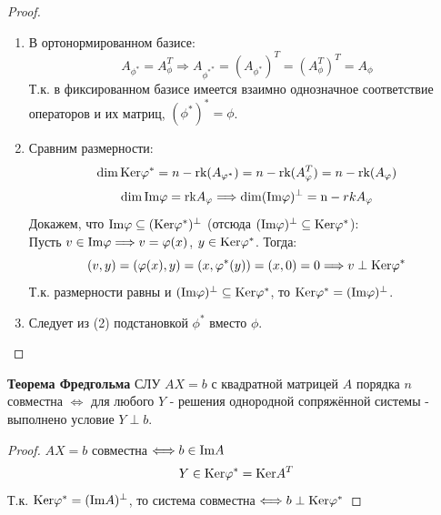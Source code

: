 \begin{proof} \tab
    \begin{enumerate}
        \item В ортонормированном базисе:
        $$A_{\phi^{*}} = A_{\phi}^T \Longrightarrow  A_{{\phi^{*}}^{*}} = (A_{\phi^{*}})^T = (A_{\phi}^T)^T = A_{\phi}$$
        Т.к. в фиксированном базисе имеется взаимно однозначное соответствие операторов и их матриц, $(\phi^{*})^{*} = \phi$.
        \item Сравним размерности:
        $$\dim \textup{Ker}\phi^{*} = n - \textup{rk}(A_{\phi^{*}}) = n - \textup{rk}(A_{\phi}^T) = n - \textup{rk}(A_{\phi})$$
        $$\dim \textup{Im}\phi = \textup{rk} A_{\phi} \Longrightarrow \dim (\textup{Im}\phi)^{\perp} = \textup n - {rk} A_{\phi}$$
        Докажем, что $\textup{Im}\phi \subseteq (\textup{Ker}\phi^{*})^{\perp}$  (отсюда $(\textup{Im}\phi)^{\perp} \subseteq \textup{Ker}\phi^{*}$):\\
        Пусть $v \in \textup{Im}\phi \Longrightarrow v = \phi(x)$, $y \in \textup{Ker}\phi^{*}$. Тогда:
        $$(v, y) = (\phi(x), y) = (x, \phi^{*}(y)) = (x, 0) = 0 \Longrightarrow v \perp \textup{Ker}\phi^{*}$$
        Т.к. размерности равны и $(\textup{Im}\phi)^{\perp} \subseteq \textup{Ker}\phi^{*}$, то $\textup{Ker}\phi^{*} = (\textup{Im}\phi)^{\perp}$.
        \item Следует из (2) подстановкой $\phi^{*}$ вместо $\phi$.
    \end{enumerate}
\end{proof}
\begin{consequense}\textbf{Теорема Фредгольма}
    СЛУ $AX = b$ с квадратной матрицей $A$ порядка $n$ совместна $\Longleftrightarrow $ для любого $Y$ - решения однородной сопряжённой системы - выполнено условие $Y \perp b$. 
\end{consequense}
\begin{proof}
    $AX = b$ совместна $\Longleftrightarrow  b \in \textup{Im}A$
    $$Y \in \textup{Ker}\phi^{*} = \textup{Ker}A^T$$
    Т.к. $\textup{Ker}\phi^{*} = (\textup{Im}A)^\perp$, то система совместна $\Longleftrightarrow  b \perp \textup{Ker}\phi^{*}$  
\end{proof}
